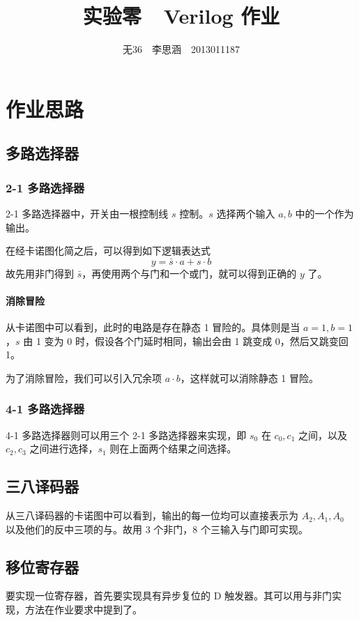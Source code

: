 \documentclass[11pt,a4paper]{article}
\begin{document}
\title{实验零\ \ Verilog 作业}
\author{无36$\quad$李思涵$\quad$2013011187}
\maketitle


\section{作业思路}

\subsection{多路选择器}
\subsubsection{2-1 多路选择器}
2-1 多路选择器中，开关由一根控制线 $s$ 控制。$s$ 选择两个输入 $a, b$ 中的一个作为输出。

在经卡诺图化简之后，可以得到如下逻辑表达式
\[
  y = \bar{s}\cdot a + s\cdot b
\]
故先用非门得到 $\bar{s}$，再使用两个与门和一个或门，就可以得到正确的 $y$ 了。

\paragraph{消除冒险}
从卡诺图中可以看到，此时的电路是存在静态 1 冒险的。具体则是当 $a = 1, b = 1$，$s$ 由 1 变为 0 时，假设各个门延时相同，输出会由 1 跳变成 0，然后又跳变回 1。

为了消除冒险，我们可以引入冗余项 $a\cdot b$，这样就可以消除静态 1 冒险。

\subsubsection{4-1 多路选择器}
4-1 多路选择器则可以用三个 2-1 多路选择器来实现，即 $s_0$ 在 $c_0, c_1$ 之间，以及 $c_2, c_3$ 之间进行选择，$s_1$ 则在上面两个结果之间选择。

\subsection{三八译码器}
从三八译码器的卡诺图中可以看到，输出的每一位均可以直接表示为 $A_2, A_1, A_0$ 以及他们的反中三项的与。故用 3 个非门，8 个三输入与门即可实现。

\subsection{移位寄存器}
要实现一位寄存器，首先要实现具有异步复位的 D 触发器。其可以用与非门实现，方法在作业要求中提到了。
\end{document}
